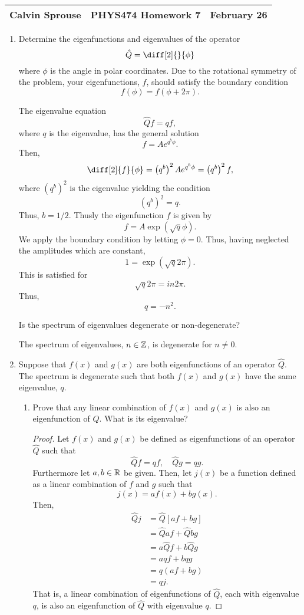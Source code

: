 \documentclass[a4paper, 12pt]{config/homework}
\begin{document}
\noindent
\begin{tabularx}{\textwidth}{>{\centering\arraybackslash}X>{\centering\arraybackslash}X>{\centering\arraybackslash}X}
Calvin Sprouse & PHYS474 Homework 7 & 2024 February 26\\
\midrule
\end{tabularx}

\begin{enumerate}
\item Determine the eigenfunctions and eigenvalues of the operator
\[\hat{Q} = \diff[2]{}{\phi}\]
where \(\phi \) is the angle in polar coordinates. Due to the rotational symmetry of the problem, your eigenfunctions, \(f\), should satisfy the boundary condition
\[f(\phi) = f(\phi + 2\pi).\]

The eigenvalue equation
\[\hat{Q}f = qf,\]
where \(q\) is the eigenvalue, has the general solution
\[f=Ae^{q^b \phi}.\]
Then,
\[\diff[2]{f}{\phi} = \left(q^b\right)^2 Ae^{q^b \phi} = \left(q^b\right)^2 f,\]
where \(\left(q^b\right)^2\) is the eigenvalue yielding the condition
\[\left(q^b\right)^2 = q.\]
Thus, \(b=1/2\). Thusly the eigenfunction \(f\) is given by
\[f = A\exp\left(\sqrt{q}\phi\right).\]
We apply the boundary condition by letting \(\phi=0\). Thus, having neglected the amplitudes which are constant,
\[1 = \exp\left(\sqrt{q}2\pi\right).\]
This is satisfied for
\[\sqrt{q}2\pi = in 2\pi.\]
Thus,
\[q = -n^2.\]

Is the spectrum of eigenvalues degenerate or non-degenerate?

The spectrum of eigenvalues, \(n\in\mathbb{Z} \), is degenerate for \(n\ne 0\).

\pagebreak
\item Suppose that \(f(x)\) and \(g(x)\) are both eigenfunctions of an operator \(\hat{Q}\). The spectrum is degenerate such that both \(f(x)\) and \(g(x)\) have the same eigenvalue, \(q\).
\begin{enumerate}[label=(\alph*.)]
\item  Prove that any linear combination of \(f(x)\) and \(g(x)\) is also an eigenfunction of \(Q\). What is its eigenvalue?

\begin{proof}
Let \(f(x)\) and \(g(x)\) be defined as eigenfunctions of an operator \(\hat{Q}\) such that
\[\hat{Q}f=qf, \quad \hat{Q}g = qg.\]
Furthermore let \(a,b\in\mathbb{R} \) be given. Then, let \(j(x)\) be a function defined as a linear combination of \(f\) and \(g\) such that
\[j(x) = af(x) + bg(x).\]
Then,
\begin{align*}
\hat{Q}j &= \hat{Q}\left[af + bg\right] \\
&= \hat{Q}af + \hat{Q}bg \\
&= a\hat{Q}f + b\hat{Q}g \\
&= aqf + bqg \\
&= q\left(af + bg\right) \\
&= qj.
\end{align*}
That is, a linear combination of eigenfunctions of \(\hat{Q}\), each with eigenvalue \(q\), is also an eigenfunction of \(\hat{Q}\) with eigenvalue \(q\).
\end{proof}


\end{enumerate}
\end{enumerate}
\end{document}
